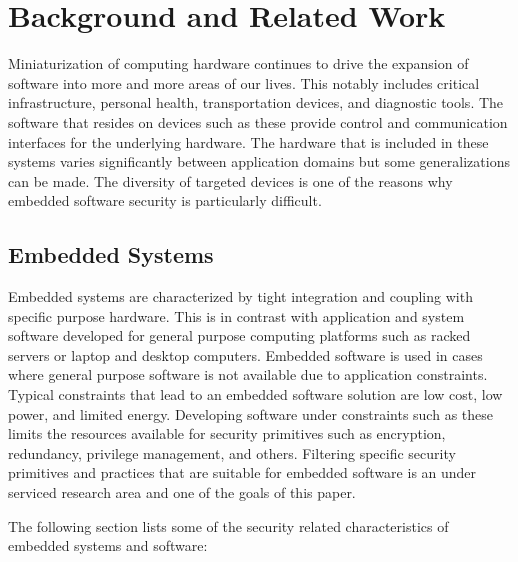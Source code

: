 \documentclass[final,conference,10pt]{IEEEtran}
\begin{document}
\section{Background and Related Work}
Miniaturization of computing hardware continues to drive the expansion of software into more and more areas of our lives.  This notably includes critical infrastructure, personal health, transportation devices, and diagnostic tools.  The software that resides on devices such as these provide control and communication interfaces for the underlying hardware.  The hardware that is included in these systems varies significantly between application domains but some generalizations can be made.  The diversity of targeted devices is one of the reasons why embedded software security is particularly difficult.

\subsection{Embedded Systems}

Embedded systems are characterized by tight integration and coupling with specific purpose hardware.  This is in contrast with application and system software developed for general purpose computing platforms such as racked servers or laptop and desktop computers.  Embedded software is used in cases where general purpose software is not available due to application constraints.  Typical constraints that lead to an embedded software solution are low cost, low power, and limited energy. Developing software under constraints such as these limits the resources available for security primitives such as encryption, redundancy, privilege management, and others.  Filtering specific security primitives and practices that are suitable for embedded software is an under serviced research area and one of the goals of this paper.

The following section lists some of the security related characteristics of embedded systems and software:
\end{document}
